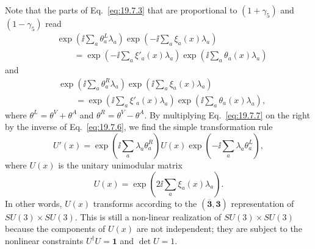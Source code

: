 Note that the parts of Eq.~\eqref{eq:19.7.3} that are proportional to $(1+\gamma_5)$ and $(1-\gamma_5)$ read
\begin{equation}
\begin{split}
&\exp\left(\ii\sum_a\theta_a^L\lambda_a\right)
\exp\left(-\ii\sum_a\xi_a(x)\lambda_a\right)
\\
&\qquad
=\exp\left(-\ii\sum_a\xi'_a(x)\lambda_a\right)
\exp\left(\ii\sum_a\theta_a(x)\lambda_a\right)
\end{split}
\tag{19.7.6}\label{eq:19.7.6}
\end{equation}
and
\begin{equation}
\begin{split}
&\exp\left(\ii\sum_a\theta_a^R\lambda_a\right)
\exp\left(\ii\sum_a\xi_a(x)\lambda_a\right)
\\
&\qquad
=\exp\left(\ii\sum_a\xi'_a(x)\lambda_a\right)
\exp\left(\ii\sum_a\theta_a(x)\lambda_a\right),
\end{split}
\tag{19.7.7}\label{eq:19.7.7}
\end{equation}
where $\theta^L=\theta^V+\theta^A$ and $\theta^R=\theta^V-\theta^A$. By multiplying Eq.~\eqref{eq:19.7.7} on the right by the inverse of Eq.~\eqref{eq:19.7.6}, we find the simple transformation rule
\begin{equation}
U'(x)
=\exp\left(\ii\sum_a\lambda_a\theta_a^R\right)
U(x)
\exp\left(-\ii\sum_a\lambda_a\theta_a^L\right),
\tag{19.7.8}\label{eq:19.7.8}
\end{equation}
where $U(x)$ is the unitary unimodular matrix
\begin{equation}
U(x)=\exp\left(2\ii\sum_a\xi_a(x)\lambda_a\right).
\tag{19.7.9}\label{eq:19.7.9}
\end{equation}
In other words, $U(x)$ transforms according to the $(\overline{\mathbf 3},\mathbf 3)$ representation of $SU(3)\times SU(3)$. This is still a non-linear realization of $SU(3)\times SU(3)$ because the components of $U(x)$ are not independent; they are subject to the nonlinear constraints $U^\dagger U=\mathbf{1}$ and $\det U=1$.

